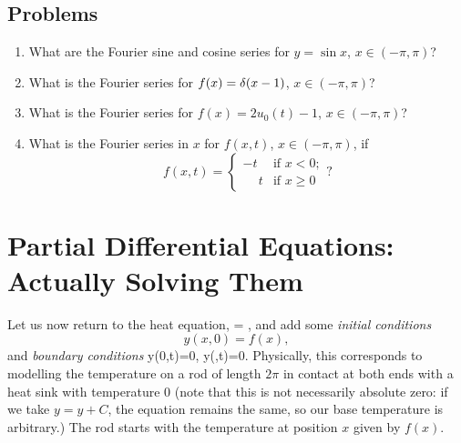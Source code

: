 \documentclass[12pt]{book}
\begin{document}

\section{Problems}

\begin{enumerate}
  \item
    What are the Fourier sine and cosine series for
    $y=\sin x$, $x \in (-\pi,\pi)$?
  \item
    What is the Fourier series for $ f(x) = \delta(x-1)$, $x \in (-\pi,\pi)$?
  \item
    What is the Fourier series for $ f(x) = 2 u_0(t)-1 $, $x \in (-\pi,\pi)$?

  \item What is the Fourier series in $x$ for $f(x,t)$, $x \in (-\pi,\pi)$, if
    \begin{dmath*}[compact]
      f(x,t) =
      \left\{ \begin{array}{ll}
        -t           & \mbox{if $x < 0$};\\
        \phantom{-}t & \mbox{if $x \geq 0$}
      \end{array} \right. ?
    \end{dmath*}

\end{enumerate}


\chapter{Partial Differential Equations:
         \\Actually Solving Them}

Let us now return to the heat equation,
\be
\label{heateq}
 = \beta {},
\ee
and add some \emph{initial conditions}
\begin{dmath*}
y(x,0)=f(x),
\end{dmath*}
and \emph{boundary conditions}
\be
\label{homdibc}
y(0,t)=0, \qquad y(\pi,t)=0.
\ee
Physically, this corresponds to modelling the temperature on a rod of length
$2\pi$ in contact at both ends with a heat sink with temperature $0$ (note
that this is not necessarily absolute zero: if we take $y=y+C$, the equation
remains the same, so our base temperature is arbitrary.) The
rod starts with the temperature at position $x$ given by $f(x)$.
\end{document}
